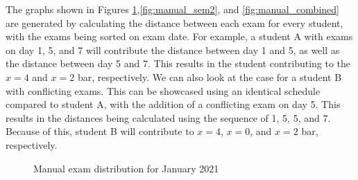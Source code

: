 The graphs shown in Figures \ref{fig:manual_sem1},\ref{fig:manual_sem2}, and \ref{fig:manual_combined} are generated by calculating the distance between each exam for every student, with the exams being sorted on exam date. For example, a student A with exams on day 1, 5, and 7 will contribute the distance between day 1 and 5, as well as the distance between day 5 and 7. This results in the student contributing to the $x = 4$ and $x = 2$ bar, respectively. We can also look at the case for a student B with conflicting exams. This can be showcased using an identical schedule compared to student A, with the addition of a conflicting exam on day 5. This results in the distances being calculated using the sequence of 1, 5, 5, and 7. Because of this, student B will contribute to $x = 4$, $x = 0$, and $x = 2$ bar, respectively.

\begin{figure}[H]
  \centering
  \hfill
  \caption{Manual exam distribution for January 2021}
  \label{fig:manual_sem1}
\end{figure}

